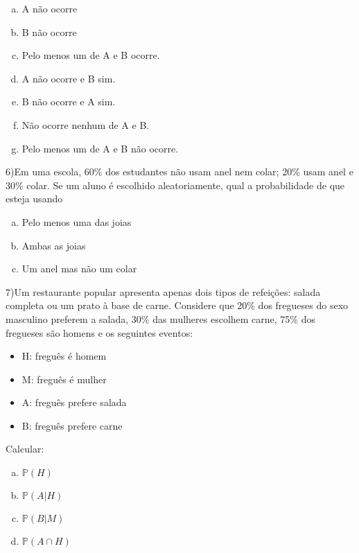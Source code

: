\documentclass{article}
\begin{document}
\begin{enumerate}[a)] %
    \item A não ocorre
    \item B não ocorre
    \item Pelo menos um de A e B ocorre. 
    \item A não ocorre e B sim.
    \item B não ocorre e A sim. 
    \item Não ocorre nenhum de A e B.
    \item Pelo menos um de A e B não ocorre. 
\end{enumerate}

\vspace{5px}

6)Em uma escola, 60\% dos estudantes não usam anel nem colar; 20\% usam anel e 30\%
colar. Se um aluno é escolhido aleatoriamente, qual a probabilidade de que esteja usando

\begin{enumerate}[a)] %
    \item Pelo menos uma das joias
    \item Ambas as joias
    \item Um anel mas não um colar
\end{enumerate}

\vspace{5px}

7)Um restaurante popular apresenta apenas dois tipos de refeições: salada completa ou um prato
à base de carne. Considere que 20\% dos fregueses do sexo masculino preferem a salada, 30\%
das mulheres escolhem carne, 75\% dos fregueses são homens e os seguintes eventos:

\begin{itemize}
    \item H: freguês é homem
    \item M: freguês é mulher
    \item A: freguês prefere salada
    \item B: freguês prefere carne
\end{itemize}

Calcular:

\begin{enumerate}[a)] %
    \item$ \mathds{P}(H)$
    \item $\mathds{P}(A|H)$
    \item $\mathds{P}(B|M)$
    \item $\mathds{P}(A \cap H)$
\end{enumerate}
\end{document}
